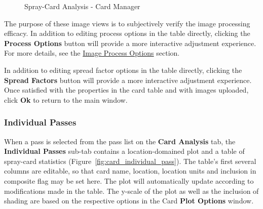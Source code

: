 \documentclass[10pt,letterpaper,titlepage]{article}
\begin{document}
    \begin{figure}[hb]
        \centering
        \caption{Spray-Card Analysis - Card Manager}
        \label{fig:card_manager_image}
    \end{figure}
    The purpose of these image views is to subjectively verify the image processing efficacy. In addition to editing process options in the table directly, clicking the \textbf{Process Options} button will provide a more interactive adjustment experience. For more details, see the \hyperref[sec:image_process]{Image Process Options} section.\par
    In addition to editing spread factor options in the table directly, clicking the \textbf{Spread Factors} button will provide a more interactive adjustment experience.
    Once satisfied with the properties in the card table and with images uploaded, click \textbf{Ok} to return to the main window.
    \FloatBarrier
    \newpage

    \subsubsection{Individual Passes}
    When a pass is selected from the pass list on the \textbf{Card Analysis} tab, the \textbf{Individual Passes} sub-tab contains a location-domained plot and a table of spray-card statistics (Figure~\ref{fig:card_individual_pass}). The table's first several columns are editable, so that card name, location, location units and inclusion in composite flag may be set here. The plot will automatically update according to modifications made in the table. The y-scale of the plot as well as the inclusion of shading are based on the respective options in the Card \textbf{Plot Options} window.
\end{document}
